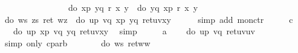 \begin{isabellebody}
\ \ \ \ \ \ \ \ \ \ \ \ \ \ \ \ do\ {\isacharbraceleft}x{\isasymleftarrow}p{\isacharsemicolon}\ y{\isasymleftarrow}q{\isacharsemicolon}\ r\ x\ y{\isacharbraceright}\ {\isacharequal}\ do\ {\isacharbraceleft}y{\isasymleftarrow}q{\isacharsemicolon}\ x{\isasymleftarrow}p{\isacharsemicolon}\ r\ x\ y{\isacharbraceright}{\isachardoublequote}\isanewline
\ \ \isamarkupfalse%
\ {\isachardoublequote}do\ {\isacharbraceleft}w{\isasymleftarrow}{\isacharquery}s{\isacharsemicolon}\ z{\isasymleftarrow}{\isacharquery}s{\isacharsemicolon}\ ret\ {\isacharparenleft}w{\isacharcomma}z{\isacharparenright}{\isacharbraceright}\ {\isacharequal}\ do\ {\isacharbraceleft}u{\isasymleftarrow}p{\isacharsemicolon}\ v{\isasymleftarrow}q{\isacharsemicolon}\ x{\isasymleftarrow}p{\isacharsemicolon}\ y{\isasymleftarrow}q{\isacharsemicolon}\ ret{\isacharparenleft}{\isacharparenleft}u{\isacharcomma}v{\isacharparenright}{\isacharcomma}{\isacharparenleft}x{\isacharcomma}y{\isacharparenright}{\isacharparenright}{\isacharbraceright}{\isachardoublequote}\isanewline
\ \ \ \ \isamarkupfalse%
\ {\isacharparenleft}simp\ add{\isacharcolon}\ mon{\isacharunderscore}ctr{\isacharparenright}\isanewline
\ \ \isamarkupfalse%
\ \isamarkupfalse%
\ c\ \isamarkupfalse%
\ {\isachardoublequote}{\isasymdots}\ {\isacharequal}\ do\ {\isacharbraceleft}u{\isasymleftarrow}p{\isacharsemicolon}\ x{\isasymleftarrow}p{\isacharsemicolon}\ v{\isasymleftarrow}q{\isacharsemicolon}\ y{\isasymleftarrow}q{\isacharsemicolon}\ ret{\isacharparenleft}{\isacharparenleft}u{\isacharcomma}v{\isacharparenright}{\isacharcomma}{\isacharparenleft}x{\isacharcomma}y{\isacharparenright}{\isacharparenright}{\isacharbraceright}{\isachardoublequote}\ \isamarkupfalse%
\ simp\isanewline
\ \ \isamarkupfalse%
\ \isamarkupfalse%
\ a\ \isamarkupfalse%
\ {\isachardoublequote}{\isasymdots}\ {\isacharequal}\ do\ {\isacharbraceleft}u{\isasymleftarrow}p{\isacharsemicolon}\ v{\isasymleftarrow}q{\isacharsemicolon}\ ret{\isacharparenleft}{\isacharparenleft}u{\isacharcomma}v{\isacharparenright}{\isacharcomma}{\isacharparenleft}u{\isacharcomma}v{\isacharparenright}{\isacharparenright}{\isacharbraceright}{\isachardoublequote}\ \isamarkupfalse%
\ {\isacharparenleft}simp\ only{\isacharcolon}\ cp{\isacharunderscore}arb{\isacharparenright}\isanewline
\ \ \isamarkupfalse%
\ \isamarkupfalse%
\ {\isachardoublequote}{\isasymdots}\ {\isacharequal}\ do\ {\isacharbraceleft}w{\isasymleftarrow}{\isacharquery}s{\isacharsemicolon}\ ret{\isacharparenleft}w{\isacharcomma}w{\isacharparenright}{\isacharbraceright}{\isachardoublequote}\ \isamarkupfalse%

\end{isabellebody}
